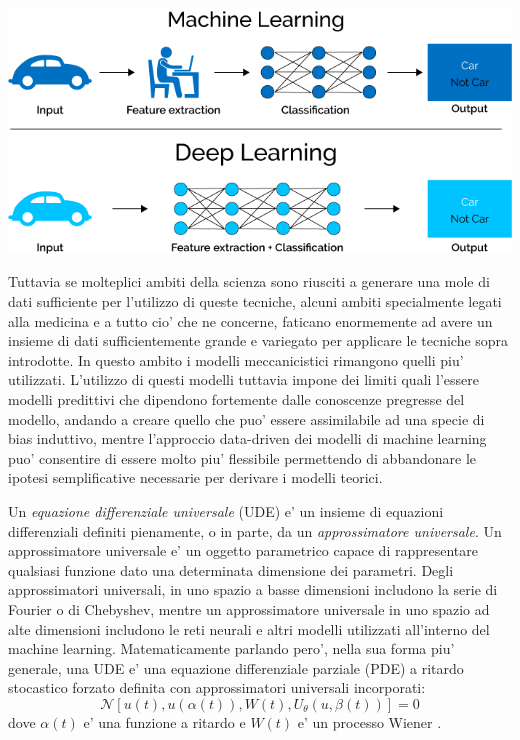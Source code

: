 \begin{minipage}{\linewidth}
    \centering
    \includegraphics[width=\textwidth]{img/Caratteristiche-e-funzionamento-del-Deep-Learning-in-informatica.png}
    \label{fig:ml_dl_example}
\end{minipage}

Tuttavia se molteplici ambiti della scienza sono riusciti a generare una mole di dati sufficiente per l'utilizzo di 
queste tecniche, alcuni ambiti specialmente legati alla medicina e a tutto cio' che ne concerne, faticano enormemente
ad avere un insieme di dati sufficientemente grande e variegato per applicare le tecniche sopra introdotte. In questo 
ambito i modelli meccanicistici rimangono quelli piu' utilizzati. L'utilizzo di questi modelli tuttavia impone dei limiti 
quali l'essere modelli predittivi che dipendono fortemente dalle conoscenze pregresse del modello, andando a creare quello 
che puo' essere assimilabile ad una specie di bias induttivo, mentre l'approccio data-driven dei modelli di machine learning 
puo' consentire di essere molto piu' flessibile permettendo di abbandonare le ipotesi semplificative 
necessarie per derivare i modelli teorici. 

Un \emph{equazione differenziale universale} (UDE) e' un insieme di equazioni differenziali definiti pienamente,
o in parte, da un \emph{approssimatore universale}. Un approssimatore universale e' un oggetto parametrico 
capace di rappresentare qualsiasi funzione dato una determinata dimensione dei parametri. Degli approssimatori 
universali, in uno spazio a basse dimensioni includono la serie di Fourier o di Chebyshev, mentre un 
approssimatore universale in uno spazio ad alte dimensioni includono le reti neurali e altri modelli utilizzati 
all'interno del machine learning. Matematicamente parlando pero', nella sua forma piu' generale, una UDE e' 
una equazione differenziale parziale (PDE) a ritardo stocastico forzato definita con approssimatori universali incorporati:
$$\mathcal{N}[u(t), u(\alpha(t)), W(t), U_\theta(u, \beta(t))] = 0$$
dove $\alpha(t)$ e' una funzione a ritardo e $W(t)$ e' un processo Wiener \cite{wiki:Processo_di_Wiener}.

